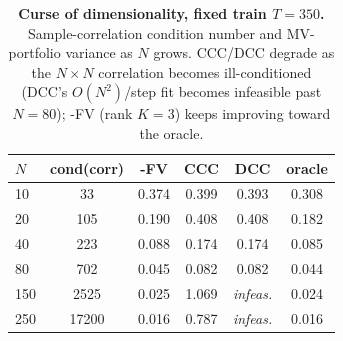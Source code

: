 \begin{table}[t]\centering\small
\setlength{\tabcolsep}{4pt}
\caption{\textbf{Curse of dimensionality, fixed train $T{=}350$.} Sample-correlation condition number and MV-portfolio variance as $N$ grows. CCC/DCC degrade as the $N\times N$ correlation becomes ill-conditioned (DCC's $O(N^2)$/step fit becomes infeasible past $N{=}80$); \cafe{}-FV (rank $K{=}3$) keeps improving toward the oracle.}
\label{tab:curse}
\begin{tabular}{@{}lccccc@{}}\toprule
$N$ & cond(corr) & \cafe{}-FV & CCC & DCC & oracle \\\midrule
10 & 33 & 0.374 & 0.399 & 0.393 & 0.308 \\
20 & 105 & 0.190 & 0.408 & 0.408 & 0.182 \\
40 & 223 & 0.088 & 0.174 & 0.174 & 0.085 \\
80 & 702 & 0.045 & 0.082 & 0.082 & 0.044 \\
150 & 2525 & 0.025 & 1.069 & \emph{infeas.} & 0.024 \\
250 & 17200 & 0.016 & 0.787 & \emph{infeas.} & 0.016 \\
\bottomrule\end{tabular}
\end{table}